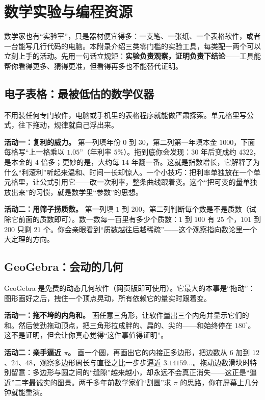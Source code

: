 \chapter{数学实验与编程资源}

数学家也有“实验室”，只是器材便宜得多：一支笔、一张纸、一个表格软件，或者一台能写几行代码的电脑。本附录介绍三类零门槛的实验工具，每类配一两个可以立刻上手的活动。先用一句话立规矩：\textbf{实验负责观察，证明负责下结论}——工具能帮你看得更多、猜得更准，但看得再多也不能替代证明。

\section{电子表格：最被低估的数学仪器}

不用装任何专门软件，电脑或手机里的表格程序就能做严肃探索。单元格里写公式，往下拖动，规律就自己浮出来。

\textbf{活动一：复利的威力。} 第一列填年份 $0$ 到 $30$，第二列第一年填本金 $1000$，下面每格写“上一格乘以 $1.05$”（年利率 $5\%$）。拖到底你会发现：$30$ 年后变成约 $4322$，是本金的 $4$ 倍多；更妙的是，大约每 $14$ 年翻一番。这就是指数增长，它解释了为什么“利滚利”听起来温和、时间一长却惊人。一个小技巧：把利率单独放在一个单元格里，让公式引用它——改一次利率，整条曲线跟着变。这个“把可变的量单独放出来”的习惯，就是数学里“参数”的思想。

\textbf{活动二：用筛子捞质数。} 第一列填 $1$ 到 $200$，第二列判断每个数是不是质数（试除它前面的质数即可）。数一数每一百里有多少个质数：$1$ 到 $100$ 有 $25$ 个，$101$ 到 $200$ 只剩 $21$ 个。你会亲眼看到“质数越往后越稀疏”——这个观察指向数论里一个大定理的方向。

\section{GeoGebra：会动的几何}

GeoGebra 是免费的动态几何软件（网页版即可使用）。它最大的本事是“拖动”：图形画好之后，拽住一个顶点晃动，所有依赖它的量实时跟着变。

\textbf{活动一：拖不垮的内角和。} 画任意三角形，让软件量出三个内角并显示它们的和。然后使劲拖动顶点，把三角形拉成胖的、扁的、尖的——和始终停在 $180^\circ$。这不是证明，但会让你真心觉得“这件事值得证明”。

\textbf{活动二：亲手逼近 $\pi$。} 画一个圆，再画出它的内接正多边形，把边数从 $6$ 加到 $12$、$24$、$48$，观察多边形周长与直径之比一步步逼近 $3.14159\dots$。拖动边数滑块时特别留意：多边形与圆之间的“缝隙”越来越小，却永远不会真正消失——这正是“逼近”二字最诚实的图景。两千多年前数学家们“割圆”求 $\pi$ 的思路，你在屏幕上几分钟就能重演。

